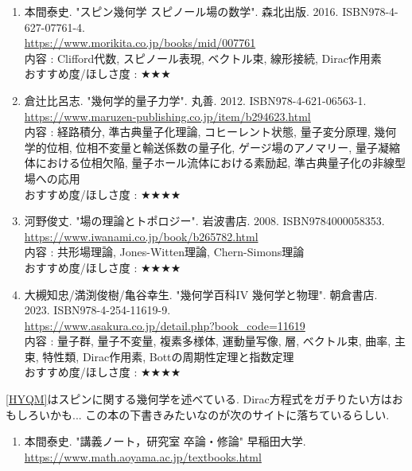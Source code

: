 \documentclass[10pt,a4paper]{jsarticle}
\begin{document}
    \begin{enumerate}
        \renewcommand{\theenumi}{[QM\arabic{enumi}]}
        \renewcommand{\labelenumi}{\theenumi}
        \setcounter{enumi}{0}
        \item \label{HYQM} 本間泰史. "スピン幾何学 スピノール場の数学". 森北出版. 2016. ISBN978-4-627-07761-4. \\
        \url{https://www.morikita.co.jp/books/mid/007761} \\
        内容 : Clifford代数, スピノール表現, ベクトル束, 線形接続, Dirac作用素\\
        おすすめ度/ほしさ度 : $\bigstar \bigstar \bigstar $
        \item \label{KHQM} 倉辻比呂志. "幾何学的量子力学". 丸善. 2012. ISBN978-4-621-06563-1. \\
        \url{https://www.maruzen-publishing.co.jp/item/b294623.html} \\
        内容 : 経路積分, 準古典量子化理論, コヒーレント状態, 量子変分原理, 幾何学的位相, 位相不変量と輸送係数の量子化, ゲージ場のアノマリー, 量子凝縮体における位相欠陥, 量子ホール流体における素励起, 準古典量子化の非線型場への応用\\
        おすすめ度/ほしさ度 : $\bigstar \bigstar \bigstar \bigstar $
        \item \label{KTQM} 河野俊丈. "場の理論とトポロジー". 岩波書店. 2008. ISBN9784000058353. \\
        \url{https://www.iwanami.co.jp/book/b265782.html} \\
        内容 : 共形場理論, Jones-Witten理論, Chern-Simons理論\\
        おすすめ度/ほしさ度 : $\bigstar \bigstar \bigstar \bigstar $
        \item \label{OMKQM} 大槻知忠/満渕俊樹/亀谷幸生. "幾何学百科IV 幾何学と物理". 朝倉書店. 2023. ISBN978-4-254-11619-9. \\
        \url{https://www.asakura.co.jp/detail.php?book_code=11619} \\
        内容 : 量子群, 量子不変量, 複素多様体, 運動量写像, 層, ベクトル束, 曲率, 主束, 特性類, Dirac作用素, Bottの周期性定理と指数定理\\
        おすすめ度/ほしさ度 : $\bigstar \bigstar \bigstar \bigstar $
    \end{enumerate}\par
    \ref{HYQM}はスピンに関する幾何学を述べている. Dirac方程式をガチりたい方はおもしろいかも... この本の下書きみたいなのが次のサイトに落ちているらしい. 
    \begin{enumerate}
        \renewcommand{\theenumi}{\arabic{enumi}}
        \renewcommand{\labelenumi}{[\theenumi]}
        \setcounter{enumi}{7}
        \item 本間泰史. "講義ノート，研究室 卒論・修論" 早稲田大学. \\
        \url{https://www.math.aoyama.ac.jp/textbooks.html} 
    \end{enumerate}
\end{document}

